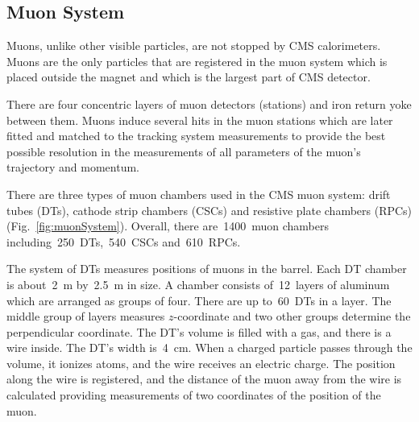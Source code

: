 \subsection{Muon System}

Muons, unlike other visible particles, are not stopped by CMS calorimeters. Muons are the only particles that are registered in the muon system which is placed outside the magnet and which is the largest part of CMS detector.

There are four concentric layers of muon detectors (stations) and iron return yoke between them. Muons induce several hits in the muon stations which are later fitted and matched to the tracking system measurements to provide the best possible resolution in the measurements of all parameters of the muon's trajectory and momentum.

There are three types of muon chambers used in the CMS muon system: drift tubes (DTs), cathode strip chambers (CSCs) and resistive plate chambers (RPCs) (Fig.~\ref{fig:muonSystem}). Overall, there are~1400~muon chambers including~250~DTs,~540~CSCs and~610~RPCs.

The system of DTs measures positions of muons in the barrel. Each DT chamber is about~2~m by~2.5~m in size. A chamber consists of~12~layers of aluminum which are arranged as groups of four. There are up to~60~DTs in a layer. The middle group of layers measures $z$-coordinate and two other groups determine the perpendicular coordinate. The DT's volume is filled with a gas, and there is a wire inside. The DT's width is~4~cm. When a charged particle passes through the volume, it ionizes atoms, and the wire receives an electric charge. The position along the wire is registered, and the distance of the muon away from the wire is calculated providing measurements of two coordinates of the position of the muon.

